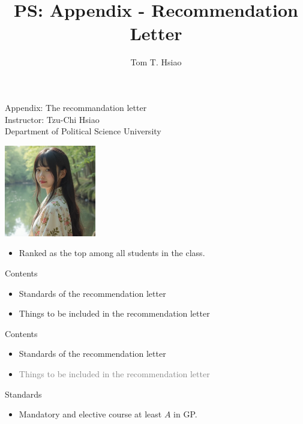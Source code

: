 \documentclass{beamer}
\title{PS: Appendix - Recommendation Letter}
\author{Tom T. Hsiao}
\date{}
\begin{document}
\begin{frame}
\begin{center}
\Large{Appendix: The recommandation letter} \\
\vspace{3em}
\normalsize{Instructor: Tzu-Chi Hsiao} \\
\vspace{3em}
\small{Department of Political Science}
\vspace{1em}
\small{University}
\end{center}
\end{frame}
\begin{frame}{}
\begin{center}
\includegraphics[width=0.3\textwidth]{letter.png} \\
\end{center}
\begin{itemize}
\item Ranked as the top among all students in the class.
\end{itemize}
\end{frame}
\begin{frame}{Contents}
\begin{itemize}
\item Standards of the recommendation letter
\item Things to be included in the recommendation letter
\end{itemize}
\end{frame}
\begin{frame}{Contents}
\begin{itemize}
\item Standards of the recommendation letter
\item \textcolor{gray}{Things to be included in the recommendation letter}
\end{itemize}
\end{frame}
\begin{frame}{Standards}
\begin{itemize}
\item Mandatory and elective course at least $A$ in GP.
\end{itemize}
\end{frame}
\end{document}
